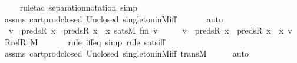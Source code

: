 \begin{isabellebody}
\ \ \ \ \isamarkupfalse%
{\isacharparenleft}{\kern0pt}rule{\isacharunderscore}{\kern0pt}tac\ separation{\isacharunderscore}{\kern0pt}notation{\isacharcomma}{\kern0pt}\ simp{\isacharparenright}{\kern0pt}\isanewline
\ \ \ \ \isamarkupfalse%
\ assms\ cartprod{\isacharunderscore}{\kern0pt}closed\ Un{\isacharunderscore}{\kern0pt}closed\ singleton{\isacharunderscore}{\kern0pt}in{\isacharunderscore}{\kern0pt}M{\isacharunderscore}{\kern0pt}iff\ \isanewline
\ \ \ \ \isamarkupfalse%
\ auto\isanewline
\isanewline
\ \ \isamarkupfalse%
\ {\isachardoublequoteopen}{\isacharbraceleft}{\kern0pt}\ v\ {\isasymin}\ preds{\isacharparenleft}{\kern0pt}R{\isacharcomma}{\kern0pt}\ x{\isacharparenright}{\kern0pt}\ {\isasymtimes}\ {\isacharparenleft}{\kern0pt}preds{\isacharparenleft}{\kern0pt}R{\isacharcomma}{\kern0pt}\ x{\isacharparenright}{\kern0pt}\ {\isasymunion}\ {\isacharbraceleft}{\kern0pt}x{\isacharbraceright}{\kern0pt}{\isacharparenright}{\kern0pt}{\isachardot}{\kern0pt}\ sats{\isacharparenleft}{\kern0pt}M{\isacharcomma}{\kern0pt}\ fm{\isacharcomma}{\kern0pt}\ {\isacharbrackleft}{\kern0pt}v{\isacharbrackright}{\kern0pt}\ {\isacharat}{\kern0pt}\ {\isacharbrackleft}{\kern0pt}{\isacharbrackright}{\kern0pt}{\isacharparenright}{\kern0pt}\ {\isacharbraceright}{\kern0pt}\ {\isacharequal}{\kern0pt}\ {\isacharbraceleft}{\kern0pt}\ v\ {\isasymin}\ preds{\isacharparenleft}{\kern0pt}R{\isacharcomma}{\kern0pt}\ x{\isacharparenright}{\kern0pt}\ {\isasymtimes}\ {\isacharparenleft}{\kern0pt}preds{\isacharparenleft}{\kern0pt}R{\isacharcomma}{\kern0pt}\ x{\isacharparenright}{\kern0pt}\ {\isasymunion}\ {\isacharbraceleft}{\kern0pt}x{\isacharbraceright}{\kern0pt}{\isacharparenright}{\kern0pt}{\isachardot}{\kern0pt}\ v\ {\isasymin}\ Rrel{\isacharparenleft}{\kern0pt}R{\isacharcomma}{\kern0pt}\ M{\isacharparenright}{\kern0pt}\ {\isacharbraceright}{\kern0pt}{\isachardoublequoteclose}\ \isanewline
\ \ \ \ \isamarkupfalse%
{\isacharparenleft}{\kern0pt}rule\ iff{\isacharunderscore}{\kern0pt}eq{\isacharcomma}{\kern0pt}\ simp{\isacharcomma}{\kern0pt}\ rule\ sats{\isacharunderscore}{\kern0pt}iff{\isacharparenright}{\kern0pt}\isanewline
\ \ \ \ \isamarkupfalse%
\ assms\ cartprod{\isacharunderscore}{\kern0pt}closed\ Un{\isacharunderscore}{\kern0pt}closed\ singleton{\isacharunderscore}{\kern0pt}in{\isacharunderscore}{\kern0pt}M{\isacharunderscore}{\kern0pt}iff\ transM\isanewline
\ \ \ \ \isamarkupfalse%
\ auto\isanewline
\isanewline
\ \ \isamarkupfalse%
\ \isamarkupfalse%

\end{isabellebody}
